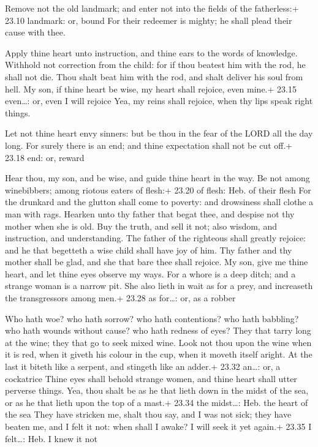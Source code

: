  Remove not the old landmark; and enter not into the fields
of the fatherless:+ 23.10 landmark: or, bound  For their
redeemer is mighty; he shall plead their cause with thee.

 Apply thine heart unto instruction, and thine ears to the
words of knowledge.  Withhold not correction from the
child: for if thou beatest him with the rod, he shall not die.
 Thou shalt beat him with the rod, and shalt deliver his
soul from hell.  My son, if thine heart be wise, my heart
shall rejoice, even mine.+ 23.15 even\ldots: or, even I will rejoice
 Yea, my reins shall rejoice, when thy lips speak right
things.

 Let not thine heart envy sinners: but be thou in the fear
of the LORD all the day long.  For surely there is an end;
and thine expectation shall not be cut off.+ 23.18 end: or, reward

 Hear thou, my son, and be wise, and guide thine heart in
the way.  Be not among winebibbers; among riotous eaters of
flesh:+ 23.20 of flesh: Heb. of their flesh  For the
drunkard and the glutton shall come to poverty: and drowsiness shall
clothe a man with rags.  Hearken unto thy father that begat
thee, and despise not thy mother when she is old.  Buy the
truth, and sell it not; also wisdom, and instruction, and understanding.
 The father of the righteous shall greatly rejoice: and he
that begetteth a wise child shall have joy of him.  Thy
father and thy mother shall be glad, and she that bare thee shall
rejoice.  My son, give me thine heart, and let thine eyes
observe my ways.  For a whore is a deep ditch; and a
strange woman is a narrow pit.  She also lieth in wait as
for a prey, and increaseth the transgressors among men.+ 23.28 as
for\ldots: or, as a robber

 Who hath woe? who hath sorrow? who hath contentions? who
hath babbling? who hath wounds without cause? who hath redness of eyes?
 They that tarry long at the wine; they that go to seek
mixed wine.  Look not thou upon the wine when it is red,
when it giveth his colour in the cup, when it moveth itself aright.
 At the last it biteth like a serpent, and stingeth like an
adder.+ 23.32 an\ldots: or, a cockatrice  Thine eyes shall
behold strange women, and thine heart shall utter perverse things.
 Yea, thou shalt be as he that lieth down in the midst of
the sea, or as he that lieth upon the top of a mast.+ 23.34 the
midst\ldots: Heb. the heart of the sea  They have stricken
me, shalt thou say, and I was not sick; they have beaten me, and I felt
it not: when shall I awake? I will seek it yet again.+ 23.35 I
felt\ldots: Heb. I knew it not

